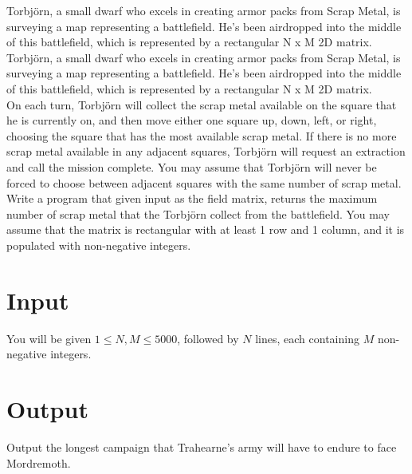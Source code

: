 
Torbjörn, a small dwarf who excels in creating armor packs from Scrap Metal, is surveying a map representing a
battlefield. He’s been airdropped into the middle of this battlefield, which is represented by a rectangular N x M 2D
matrix. \\

Torbjörn, a small dwarf who excels in creating armor packs from Scrap Metal, is surveying a map representing a
battlefield. He’s been airdropped into the middle of this battlefield, which is represented by a rectangular N x M
2D matrix. \\

On each turn, Torbjörn will collect the scrap metal available on the square that he is currently on, and then move
either one square up, down, left, or right, choosing the square that has the most available scrap metal. If there is no
more scrap metal available in any adjacent squares, Torbjörn will request an extraction and call the mission complete.
You may assume that Torbjörn will never be forced to choose between adjacent squares with the same number of scrap
metal. \\

Write a program that given input as the field matrix, returns the maximum number of scrap metal that the Torbjörn
collect from the battlefield. You may assume that the matrix is rectangular with at least 1 row and 1 column, and it is
populated with non-negative integers. \\

\section*{Input}
You will be given $1 \leq N,M \leq 5000$, followed by $N$ lines, each containing $M$  non-negative integers.
\section*{Output}
Output the longest campaign that Trahearne’s army will have to endure to face Mordremoth. \\
